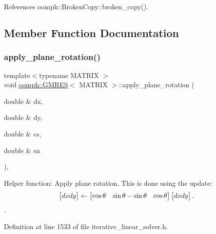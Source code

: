 References oomph\+::\+Broken\+Copy\+::broken\+\_\+copy().



\subsection{Member Function Documentation}
\mbox{\label{classoomph_1_1GMRES_aac9196b17069716323d535922bdb512d}} 
\subsubsection{\texorpdfstring{apply\+\_\+plane\+\_\+rotation()}{apply\_plane\_rotation()}}
{\footnotesize\ttfamily template$<$typename M\+A\+T\+R\+IX $>$ \\
void \hyperlink{classoomph_1_1GMRES}{oomph\+::\+G\+M\+R\+ES}$<$ M\+A\+T\+R\+IX $>$\+::apply\+\_\+plane\+\_\+rotation (\begin{DoxyParamCaption}\item[{double \&}]{dx,  }\item[{double \&}]{dy,  }\item[{double \&}]{cs,  }\item[{double \&}]{sn }\end{DoxyParamCaption})\hspace{0.3cm}{\ttfamily [inline]}, {\ttfamily [private]}}



Helper function\+: Apply plane rotation. This is done using the update\+: \[ \begin{bmatrix} dx \newline dy \end{bmatrix} \leftarrow \begin{bmatrix} \cos\theta & \sin\theta \newline -\sin\theta & \cos\theta \end{bmatrix} \begin{bmatrix} dx \newline dy \end{bmatrix}. \]. 



Definition at line 1533 of file iterative\+\_\+linear\+\_\+solver.\+h.

\mbox{\label{classoomph_1_1GMRES_a5593b936e70b6668758bb94f4097b9b1}} 

